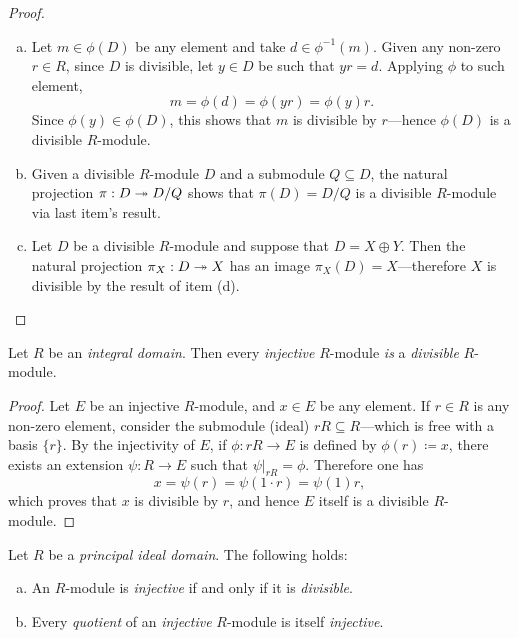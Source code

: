 \begin{proof}
\begin{enumerate}[(a)]
        \item Let \(m \in \phi(D)\) be any element and take \(d \in
              \phi^{-1}(m)\). Given any non-zero \(r \in R\), since \(D\) is divisible, let
              \(y \in D\) be such that \(y r = d\). Applying \(\phi\) to such element,
              \[
                  m = \phi(d) = \phi(y r) = \phi(y) r.
              \]
              Since \(\phi(y) \in \phi(D)\), this shows that \(m\) is divisible by
              \(r\)---hence \(\phi(D)\) is a divisible \(R\)-module.

        \item Given a divisible \(R\)-module \(D\) and a submodule \(Q \subseteq D\),
              the natural projection \(\pi: D \twoheadrightarrow D/Q\) shows that \(\pi(D) = D/Q\) is a
              divisible \(R\)-module via last item's result.

        \item Let \(D\) be a divisible \(R\)-module and suppose that \(D = X \oplus
              Y\). Then the natural projection \(\pi_X: D \twoheadrightarrow X\) has an image \(\pi_X(D) =
              X\)---therefore \(X\) is divisible by the result of item (d).
    \end{enumerate}
\end{proof}

\begin{proposition}
    \label{prop:int-domain-injective-mod-is-divisible}
    Let \(R\) be an \emph{integral domain}. Then every \emph{injective} \(R\)-module
    \emph{is} a \emph{divisible} \(R\)-module.
\end{proposition}

\begin{proof}
    Let \(E\) be an injective \(R\)-module, and \(x \in E\) be any element. If
    \(r \in R\) is any non-zero element, consider the submodule (ideal)
    \(r R \subseteq R\)---which is free with a basis \(\{r\}\). By the injectivity
    of \(E\), if \(\phi: r R \to E\) is defined by \(\phi(r) \coloneq x\), there
    exists an extension \(\psi: R \to E\) such that \(\psi|_{r R} =
    \phi\). Therefore one has
    \[
        x = \psi(r) = \psi(1 \cdot r) = \psi(1) r,
    \]
    which proves that \(x\) is divisible by \(r\), and hence \(E\) itself is a
    divisible \(R\)-module.
\end{proof}

\begin{proposition}
    \label{prop:int-dom-PID-divisible-module-iff-injective-and-quotient}
    Let \(R\) be a \emph{principal ideal domain}. The following holds:
    \begin{enumerate}[(a)]\setlength\itemsep{0em}
        \item An \(R\)-module is \emph{injective} if and only if it is
              \emph{divisible}.

        \item Every \emph{quotient} of an \emph{injective} \(R\)-module is itself
              \emph{injective}.
    \end{enumerate}
\end{proposition}


